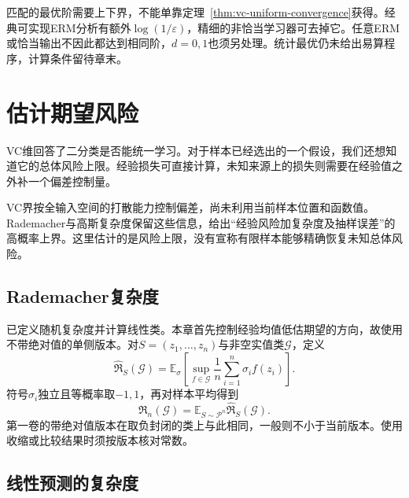 匹配的最优阶需要上下界，不能单靠定理~\ref{thm:vc-uniform-convergence}获得。经典可实现ERM分析有额外$\log(1/\varepsilon)$，精细的非恰当学习器可去掉它。任意ERM或恰当输出不因此都达到相同阶，$d=0,1$也须另处理。统计最优仍未给出易算程序，计算条件留待章末。

\section{估计期望风险}
\label{sec:rademacher-complexity}

VC维回答了二分类是否能统一学习。对于样本已经选出的一个假设，我们还想知道它的总体风险上限。经验损失可直接计算，未知来源上的损失则需要在经验值之外补一个偏差控制量。

VC界按全输入空间的打散能力控制偏差，尚未利用当前样本位置和函数值。Rademacher与高斯复杂度保留这些信息，给出“经验风险加复杂度及抽样误差”的高概率上界。这里估计的是风险上限，没有宣称有限样本能够精确恢复未知总体风险。

\subsection{Rademacher复杂度}

已定义随机复杂度并计算线性类。本章首先控制经验均值低估期望的方向，故使用不带绝对值的单侧版本。对$S=(z_1,\ldots,z_n)$与非空实值类$\mathcal G$，定义
\begin{equation}
 \widehat{\mathfrak R}_S(\mathcal G)
 =\mathbb E_\sigma\left[\sup_{f\in\mathcal G}
       \frac1n\sum_{i=1}^n\sigma_i f(z_i)\right].
 \label{eq:learning-empirical-rademacher}
\end{equation}
符号$\sigma_i$独立且等概率取$-1,1$，再对样本平均得到
\[
 \mathfrak R_n(\mathcal G)=\mathbb E_{S\sim\mathcal P^n}
       \widehat{\mathfrak R}_S(\mathcal G).
\]
第一卷的带绝对值版本在取负封闭的类上与此相同，一般则不小于当前版本。使用收缩或比较结果时须按版本核对常数。

\subsection{线性预测的复杂度}

